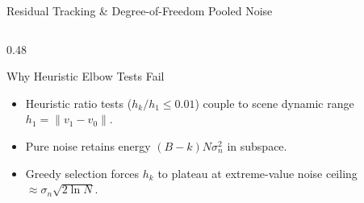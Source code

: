 \documentclass[aspectratio=169, 10pt]{beamer}
\begin{document}
\begin{frame}{Residual Tracking \& Degree-of-Freedom Pooled Noise}
\begin{columns}[T]
\begin{column}{0.48\textwidth}
      \begin{block}{Why Heuristic Elbow Tests Fail}
        \footnotesize
        \begin{itemize}\setlength{\itemsep}{2pt}
          \item Heuristic ratio tests ($h_k / h_1 \le 0.01$) couple to scene dynamic range $h_1 = \|v_1 - v_0\|$.
          \item Pure noise retains energy $(B-k)N\sigma_n^2$ in subspace.
          \item Greedy selection forces $h_k$ to plateau at extreme-value noise ceiling $\approx \sigma_n \sqrt{2 \ln N}$.
        \end{itemize}
      \end{block}
    \end{column}
  \end{columns}
\end{frame}
\end{document}
